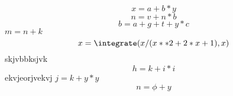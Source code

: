 $$x=a+b*y$$
$$n=v+n*b$$
\begin{equation}b=a+g+t+y*c\end{equation}
\(m=n+k\)
$$x=\integrate(x/(x**2+2*x+1), x)$$
skjvbbksjvk $$h=k+i*i$$ ekvjeorjvekvj
$j=k+y*y$
$$n=\phi+y$$